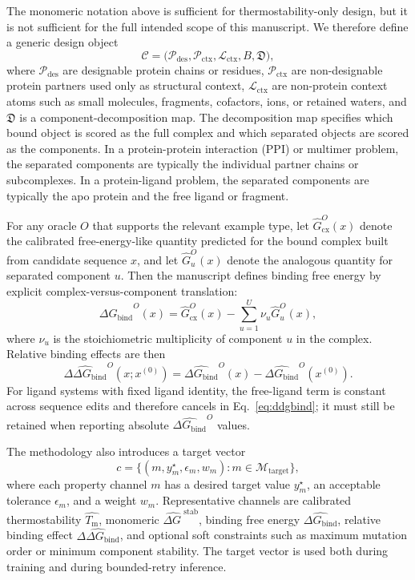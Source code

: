 \documentclass[11pt]{article}
\newcommand{\dG}{\ensuremath{\Delta G \ }}
\newcommand{\Tm}{\ensuremath{T_{\mathrm m}}}
\newcommand{\ddGbind}{\ensuremath{\Delta\Delta G_{\mathrm{bind}}}}
\newcommand{\dGbind}{\ensuremath{\Delta G_{\mathrm{bind}}}}
\newcommand{\Cx}{\mathcal{C}}
\begin{document}
	The monomeric notation above is sufficient for thermostability-only design, but it is not sufficient for the full intended scope of this manuscript. We therefore define a generic design object
	\begin{equation}
		\Cx = \big(\mathcal{P}_{\mathrm{des}},\mathcal{P}_{\mathrm{ctx}},\mathcal{L}_{\mathrm{ctx}},B,\mathfrak{D}\big),
	\end{equation}
	where $\mathcal{P}_{\mathrm{des}}$ are designable protein chains or residues, $\mathcal{P}_{\mathrm{ctx}}$ are non-designable protein partners used only as structural context, $\mathcal{L}_{\mathrm{ctx}}$ are non-protein context atoms such as small molecules, fragments, cofactors, ions, or retained waters, and $\mathfrak{D}$ is a component-decomposition map. The decomposition map specifies which bound object is scored as the full complex and which separated objects are scored as the components. In a protein-protein interaction (PPI) or multimer problem, the separated components are typically the individual partner chains or subcomplexes. In a protein-ligand problem, the separated components are typically the apo protein and the free ligand or fragment.
	
	For any oracle $O$ that supports the relevant example type, let $\widehat G^{O}_{\mathrm{cx}}(x)$ denote the calibrated free-energy-like quantity predicted for the bound complex built from candidate sequence $x$, and let $\widehat G^{O}_{u}(x)$ denote the analogous quantity for separated component $u$. Then the manuscript defines binding free energy by explicit complex-versus-component translation:
	\begin{equation}
		\label{eq:dgbind}
		\widehat{\dGbind}^{O}(x)=\widehat G^{O}_{\mathrm{cx}}(x)-\sum_{u=1}^{U}\nu_u\widehat G^{O}_{u}(x),
	\end{equation}
	where $\nu_u$ is the stoichiometric multiplicity of component $u$ in the complex. Relative binding effects are then
	\begin{equation}
		\label{eq:ddgbind}
		\widehat{\ddGbind}^{O}(x;x^{(0)})=\widehat{\dGbind}^{O}(x)-\widehat{\dGbind}^{O}(x^{(0)}).
	\end{equation}
	For ligand systems with fixed ligand identity, the free-ligand term is constant across sequence edits and therefore cancels in Eq.~\eqref{eq:ddgbind}; it must still be retained when reporting absolute $\widehat{\dGbind}^{O}$ values.
	
	The methodology also introduces a target vector
	\begin{equation}
		c = \{(m,y_m^{\star},\epsilon_m,w_m): m\in\mathcal{M}_{\mathrm{target}}\},
	\end{equation}
	where each property channel $m$ has a desired target value $y_m^{\star}$, an acceptable tolerance $\epsilon_m$, and a weight $w_m$. Representative channels are calibrated thermostability $\widehat{\Tm}$, monomeric $\widehat{\dG}^{\mathrm{stab}}$, binding free energy $\widehat{\dGbind}$, relative binding effect $\widehat{\ddGbind}$, and optional soft constraints such as maximum mutation order or minimum component stability. The target vector is used both during training and during bounded-retry inference.
	
\end{document}
